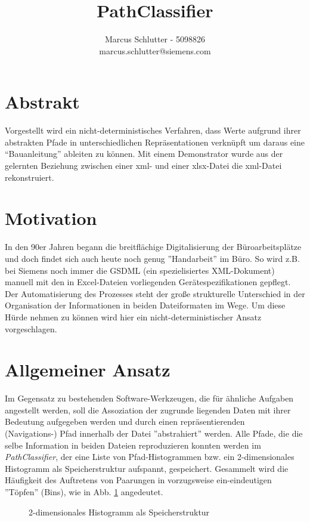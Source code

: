 \documentclass[a4paper,10pt]{article}
\title{PathClassifier}
\author{Marcus Schlutter - 5098826\\marcus.schlutter@siemens.com}
\begin{document}
\maketitle

\section{Abstrakt}
Vorgestellt wird ein nicht-deterministisches Verfahren, dass Werte aufgrund ihrer abstrakten Pfade in
unterschiedlichen Repräsentationen verknüpft um daraus eine ``Bauanleitung'' ableiten zu können. Mit
einem Demonstrator wurde aus der gelernten Beziehung zwischen einer xml- und einer xlsx-Datei die
xml-Datei rekonstruiert.

\section{Motivation}
\label{sec:motivation}
In den 90er Jahren begann die breitflächige Digitalisierung der Büroarbeitsplätze und doch findet sich auch
heute noch genug ''Handarbeit'' im Büro. So wird z.B. bei Siemens noch immer die GSDML (ein spezielisiertes
XML-Dokument) manuell mit den in Excel-Dateien vorliegenden Gerätespezifikationen gepflegt. Der
Automatisierung des Prozesses steht der große strukturelle Unterschied in der Organisation der Informationen
in beiden Dateiformaten im Wege. Um diese Hürde nehmen zu können wird hier ein nicht-deterministischer
Ansatz vorgeschlagen.

\section{Allgemeiner Ansatz}
\label{sec:approach}
Im Gegensatz zu bestehenden Software-Werkzeugen, die für ähnliche Aufgaben angestellt werden, soll die
Assoziation der zugrunde liegenden Daten mit ihrer Bedeutung aufgegeben werden und durch einen
repräsentierenden\\(Navigations-) Pfad innerhalb der Datei ''abstrahiert'' werden. Alle Pfade, die
die selbe Information in beiden Dateien reproduzieren konnten werden im \textit{PathClassifier}, der eine
Liste von Pfad-Histogrammen bzw. ein 2-dimensionales Histogramm als Speicherstruktur aufspannt, gespeichert.
Gesammelt wird die Häufigkeit des Auftretens von Paarungen in vorzugsweise ein-eindeutigen ''Töpfen''
(Bins), wie in Abb. \ref{classifier_table} angedeutet.

\begin{figure}[h]
 \centering
 \caption{2-dimensionales Histogramm als Speicherstruktur}
 \label{classifier_table}
\end{figure}
\end{document}
